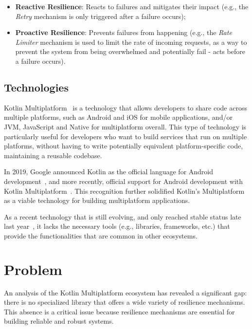 \begin{itemize}
    \item \textbf{Reactive Resilience}: Reacts to failures and mitigates their impact (e.g., the \textit{Retry} mechanism is only triggered after a failure occurs);
    \item \textbf{Proactive Resilience}: Prevents failures from happening (e.g., the \textit{Rate Limiter} mechanism is used to limit the rate of incoming requests, as a way to prevent the system from being overwhelmed and potentially fail - acts before a failure occurs).
\end{itemize}

\subsection{Technologies}\label{subsec:technologies}

Kotlin Multiplatform~\cite{kotlin-multiplatform} is a technology that allows developers to share code across multiple platforms,
such as Android and iOS for mobile applications, and/or JVM, JavaScript and Native for multiplatform overall.
This type of technology is particularly useful for developers
who want to build services that run on multiple platforms,
without having to write potentially equivalent platform-specific code, maintaining a reusable codebase.

In 2019, Google announced Kotlin as the official language for Android development~\cite{google-android-kotlin},
and more recently,
official support for Android development with Kotlin Multiplatform~\cite{android-kotlin-multiplatform, google-kotlin-multiplatform}.
This recognition further solidified Kotlin's Multiplatform as a viable technology for building multiplatform applications.

As a recent technology that is still evolving,
and only reached stable status late last year~\cite{kotlin-multiplatform-stable},
it lacks the necessary tools (e.g., libraries, frameworks, etc.)
that provide the functionalities that are common in other ecosystems.


\section{Problem}\label{sec:problem}

An analysis of the Kotlin Multiplatform ecosystem has revealed a significant gap:
there is no specialized library that offers a wide variety of resilience mechanisms.
This absence is a critical issue because resilience mechanisms are essential for building reliable and robust systems.

